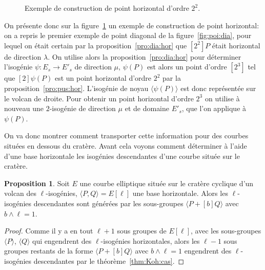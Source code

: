 \documentclass[10pt,a4paper]{book}
\theoremstyle{plain}
\theoremstyle{definition}
\theoremstyle{definition}
\theoremstyle{definition}
\theoremstyle{definition}
\newtheorem{prop}[thm]{Proposition}
\theoremstyle{definition}
\theoremstyle{remark}
\theoremstyle{remark}
\theoremstyle{definition}
\begin{document}
\begin{figure}
\begin{center}
\begin{tikzpicture}[scale=0.50]
\end{tikzpicture}
\end{center}
\caption{ \label{fig:poi:hor} Exemple de construction de point horizontal d'ordre $2^2$. 
}
\end{figure}

On présente donc sur la figure~\ref{fig:poi:hor} un exemple de construction de 
point horizontal: on a repris le premier exemple de point 
diagonal de la figure~\ref{fig:poi:dia}, pour lequel on était certain par la 
proposition~\ref{pro:dia:hor} que $[2^2]P$ était horizontal de direction 
$\lambda$. On utilise alors la proposition~\ref{pro:dia:hor} pour déterminer 
l'isogénie $\psi:E_s \rightarrow E'_s$ de direction $\mu$, $\psi(P)$ est alors 
un point d'ordre $[2^3]$ tel que $[2]\psi(P)$
est un point horizontal d'ordre $2^2$ par la proposition~\ref{pro:pus:hor}. 
L'isogénie de noyau $ \langle \psi(P) \rangle$ est donc représentée sur le 
volcan de droite. Pour obtenir un point horizontal d'ordre $2^3$ on utilise à 
nouveau une $2$-isogénie de direction $\mu$ et de domaine $E'_s$, que l'on 
applique à $\psi(P)$.

On va donc montrer comment transporter cette information pour des courbes 
situées en dessous du cratère. Avant cela voyons comment déterminer à l'aide 
d'une base horizontale les isogénies descendantes d'une courbe située sur le 
cratère.

\begin{prop}
Soit $E$ une courbe elliptique située sur le cratère cyclique d'un volcan des $\ell$-isogénies, $\langle P, Q \rangle= E[\ell]$ une base horizontale. Alors les $\ell$-isogénies descendantes sont générées par les sous-groupes $\langle P+ [b]Q \rangle$ avec $b \wedge \ell =1$.
\end{prop}

\begin{proof}
Comme il y a en tout $\ell+1$ sous groupes de $E[\ell]$, avec les sous-groupes 
$\langle P \rangle$,  $\langle Q \rangle$ qui engendrent des $\ell$-isogénies 
horizontales, alors les $\ell-1$ sous groupes restants de la forme 
$\langle P+ [b] Q \rangle$ avec $b \wedge \ell =1$ engendrent des 
$\ell$-isogénies descendantes par le théorème~\ref{thm:Koh:cas}.
\end{proof}
\end{document}
